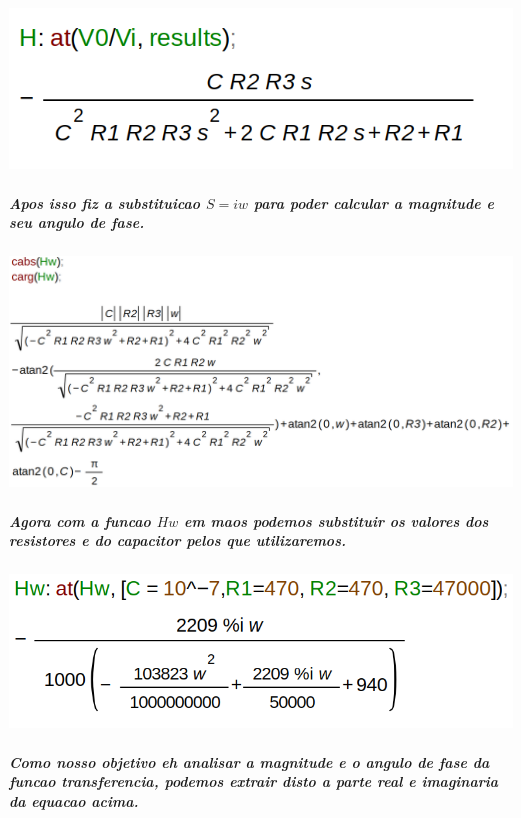\documentclass[12pt,twoside, a4paper, twocolumn]{article}
\begin{document}
\subparagraph*{}

\begin{adjustbox}{scale=0.33}
    \includegraphics{H.png}
\end{adjustbox}

\subparagraph*{Apos isso fiz a substituicao $S = iw$ para poder calcular a magnitude e seu angulo de fase.}

\subparagraph*{}

\begin{adjustbox}{scale=.17}
    \includegraphics{sjw.png}
\end{adjustbox}

\subparagraph*{Agora com a funcao $Hw$ em maos podemos substituir os valores dos resistores e do capacitor pelos que utilizaremos.}

\begin{adjustbox}{scale=0.30}
    \includegraphics{substituicao.png}
\end{adjustbox}

\subparagraph*{Como nosso objetivo eh analisar a magnitude e o angulo de fase da funcao transferencia, podemos extrair disto a parte real e imaginaria da equacao acima.}
\end{document}
